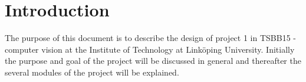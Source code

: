 \section{Introduction}

The purpose of this document is to describe the design of project 1 in TSBB15 - computer vision at the  Institute of Technology at Linköping University. Initially the purpose and goal of the project will be discussed in general and thereafter the several modules of the project will be explained.